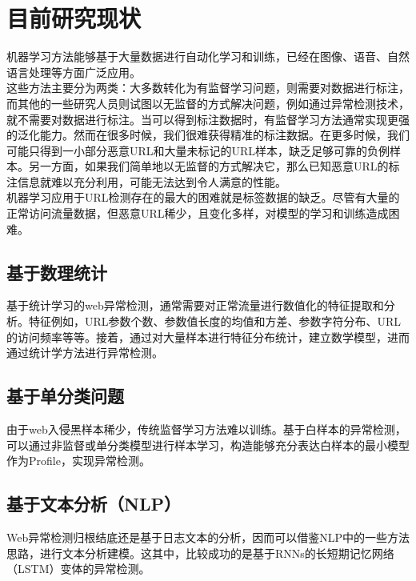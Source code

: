 \section{目前研究现状}
机器学习方法能够基于大量数据进行自动化学习和训练，已经在图像、语音、自然语言处理等方面广泛应用。
\\\indent{}这些方法主要分为两类：大多数转化为有监督学习问题，则需要对数据进行标注，而其他的一些研究人员则试图以无监督的方式解决问题，例如通过异常检测技术，就不需要对数据进行标注。当可以得到标注数据时，有监督学习方法通常实现更强的泛化能力。然而在很多时候，我们很难获得精准的标注数据。在更多时候，我们可能只得到一小部分恶意URL和大量未标记的URL样本，缺乏足够可靠的负例样本。另一方面，如果我们简单地以无监督的方式解决它，那么已知恶意URL的标注信息就难以充分利用，可能无法达到令人满意的性能。
\\\indent{}机器学习应用于URL检测存在的最大的困难就是标签数据的缺乏。尽管有大量的正常访问流量数据，但恶意URL稀少，且变化多样，对模型的学习和训练造成困难。
\subsection{基于数理统计}
基于统计学习的web异常检测，通常需要对正常流量进行数值化的特征提取和分析。特征例如，URL参数个数、参数值长度的均值和方差、参数字符分布、URL的访问频率等等。接着，通过对大量样本进行特征分布统计，建立数学模型，进而通过统计学方法进行异常检测。
\subsection{基于单分类问题}
由于web入侵黑样本稀少，传统监督学习方法难以训练。基于白样本的异常检测，可以通过非监督或单分类模型进行样本学习，构造能够充分表达白样本的最小模型作为Profile，实现异常检测。
\subsection{基于文本分析（NLP）}
Web异常检测归根结底还是基于日志文本的分析，因而可以借鉴NLP中的一些方法思路，进行文本分析建模。这其中，比较成功的是基于RNNs的长短期记忆网络（LSTM）变体的异常检测。